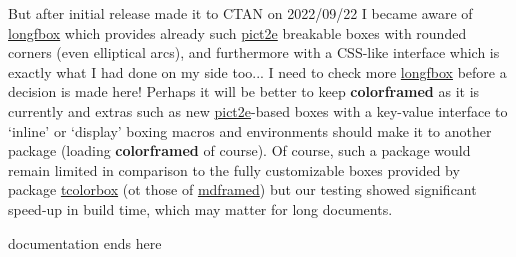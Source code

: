 \documentclass[a4paper,dvipdfmx,10pt,english]{article}
\def\ctanpackage#1{\href{https://ctan.org/pkg/#1}{#1}}
\newcommand\colorframed{%
        \texorpdfstring{{\color{joli}\bfseries colorframed}}{colorframed}\xspace}
\begin{document}
\begin{snugshade}
  But after initial release made it to CTAN on
  2022/09/22 I became aware of \ctanpackage{longfbox} which
  provides already such \ctanpackage{pict2e} breakable boxes with
  rounded corners (even elliptical arcs), and furthermore with a
  CSS-like interface which is exactly what I had done on my side
  too... I need to check more \ctanpackage{longfbox} before a
  decision is made here!  Perhaps it will be better to keep
  \colorframed as it is currently and
  extras such as new \ctanpackage{pict2e}-based boxes with a key-value
  interface to `inline' or `display' boxing macros and environments
  should make it to another package (loading \colorframed of course).
%
Of course, such a package would remain limited in comparison to the fully
customizable boxes provided by package \ctanpackage{tcolorbox} (ot
those of \ctanpackage{mdframed}) but our testing showed
significant speed-up in build time, which may matter for long
documents.

\end{snugshade}
\centerline{\hrulefill documentation ends here\hrulefill}
\end{document}
